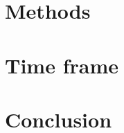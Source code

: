 \documentclass[11pt,
  paper=a4, 
  bibliography=totocnumbered,
	captions=tableheading,
	BCOR=10mm
]{scrreprt}
\theoremstyle{definition}
\begin{document}
\chapter{Methods}

\section{}


\chapter{Time frame}


\chapter{Conclusion}






\glsaddall
\printglossaries

\printbibliography
\end{document}
